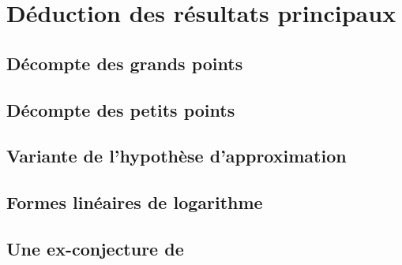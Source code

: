 
\chapter{Déduction des résultats principaux}

\section{Décompte des grands points}

\section{Décompte des petits points}

\section{Variante de l'hypothèse d'approximation}

\section{Formes linéaires de logarithme}

\section{Une ex-conjecture de }

\endinput


